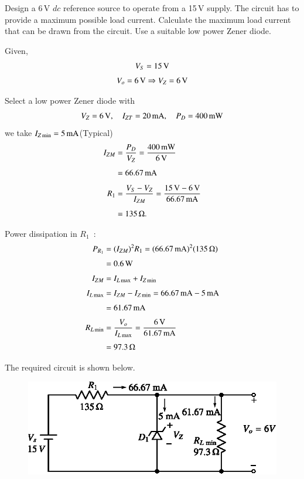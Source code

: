 \begin{example}\label{exam2.28}
Design a 6\,V $dc$ reference source to operate from a 15\,V supply. The circuit has to provide a maximum possible load current. Calculate the maximum load current that can be drawn from the circuit. Use a suitable low power Zener diode.
\end{example}

\begin{solution}
Given,
\begin{gather*}
V_{S}=15\text{\,V}\\[3pt]
V_{o}=6\text{\,V}\Rightarrow V_{Z}=6\text{\,V}
\end{gather*}

Select a low power Zener diode with
$$
V_{Z}=6\text{\,V},\quad I_{ZT}=20\text{\,mA},\quad P_{D}=400\text{\,mW}
$$
we take $I_{Z\min}=5\text{\,mA}$\quad (Typical)
\begin{align*}
I_{ZM} &= \frac{P_{D}}{V_{Z}}=\frac{400\text{\,mW}}{6\text{\,V}}\\[4pt]
&= 66.67\text{\,mA}\\[4pt]
R_{1} &= \frac{V_{S}-V_{Z}}{I_{ZM}}=\frac{15\text{\,V}-6\text{\,V}}{66.67\text{\,mA}}\\[4pt]
&= 135\,\Omega.
\end{align*}

\eject

Power dissipation in $R_{1}$~:
\begin{align*}
P_{R_{1}} &= (I_{ZM})^{2}R_{1}=(66.67\text{\,mA})^{2}(135\,\Omega)\\[3pt]
&= 0.6\text{\,W}\\[3pt]
I_{ZM} &= I_{L\max}+I_{Z\min}\\[3pt]
I_{L\max} &= I_{ZM}-I_{Z\min}=66.67\text{\,mA}-5\text{\,mA}\\[3pt]
&= 61.67\text{\,mA}\\[3pt]
R_{L\min} &= \frac{V_{o}}{I_{L\max}}=\frac{6\text{\,V}}{61.67\text{\,mA}}\\[3pt]
&= 97.3\,\Omega
\end{align*}

The required circuit is shown below.
\begin{figure}[H]
\centering
\includegraphics{chap2/sol2.26a.eps}
\end{figure}
\vskip -1cm
\end{solution}


